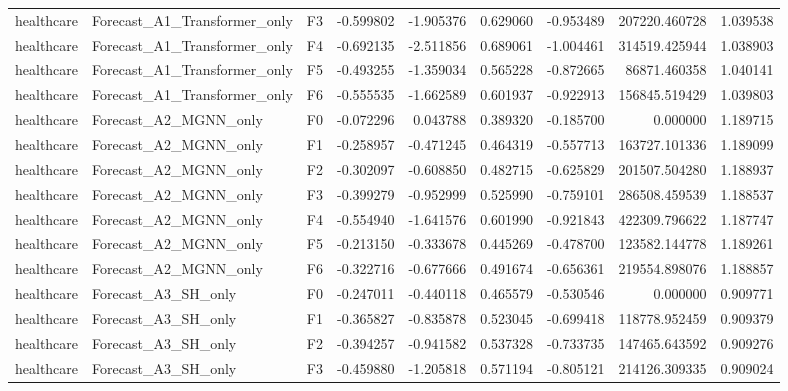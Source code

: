 \begin{tabular}{lllrrrrrr}
healthcare & Forecast\_A1\_Transformer\_only &  F3 & -0.599802 & -1.905376 & 0.629060 & -0.953489 &    207220.460728 &             1.039538 \\
healthcare & Forecast\_A1\_Transformer\_only &  F4 & -0.692135 & -2.511856 & 0.689061 & -1.004461 &    314519.425944 &             1.038903 \\
healthcare & Forecast\_A1\_Transformer\_only &  F5 & -0.493255 & -1.359034 & 0.565228 & -0.872665 &     86871.460358 &             1.040141 \\
healthcare & Forecast\_A1\_Transformer\_only &  F6 & -0.555535 & -1.662589 & 0.601937 & -0.922913 &    156845.519429 &             1.039803 \\
healthcare &        Forecast\_A2\_MGNN\_only &  F0 & -0.072296 &  0.043788 & 0.389320 & -0.185700 &         0.000000 &             1.189715 \\
healthcare &        Forecast\_A2\_MGNN\_only &  F1 & -0.258957 & -0.471245 & 0.464319 & -0.557713 &    163727.101336 &             1.189099 \\
healthcare &        Forecast\_A2\_MGNN\_only &  F2 & -0.302097 & -0.608850 & 0.482715 & -0.625829 &    201507.504280 &             1.188937 \\
healthcare &        Forecast\_A2\_MGNN\_only &  F3 & -0.399279 & -0.952999 & 0.525990 & -0.759101 &    286508.459539 &             1.188537 \\
healthcare &        Forecast\_A2\_MGNN\_only &  F4 & -0.554940 & -1.641576 & 0.601990 & -0.921843 &    422309.796622 &             1.187747 \\
healthcare &        Forecast\_A2\_MGNN\_only &  F5 & -0.213150 & -0.333678 & 0.445269 & -0.478700 &    123582.144778 &             1.189261 \\
healthcare &        Forecast\_A2\_MGNN\_only &  F6 & -0.322716 & -0.677666 & 0.491674 & -0.656361 &    219554.898076 &             1.188857 \\
healthcare &          Forecast\_A3\_SH\_only &  F0 & -0.247011 & -0.440118 & 0.465579 & -0.530546 &         0.000000 &             0.909771 \\
healthcare &          Forecast\_A3\_SH\_only &  F1 & -0.365827 & -0.835878 & 0.523045 & -0.699418 &    118778.952459 &             0.909379 \\
healthcare &          Forecast\_A3\_SH\_only &  F2 & -0.394257 & -0.941582 & 0.537328 & -0.733735 &    147465.643592 &             0.909276 \\
healthcare &          Forecast\_A3\_SH\_only &  F3 & -0.459880 & -1.205818 & 0.571194 & -0.805121 &    214126.309335 &             0.909024 \\

\end{tabular}
